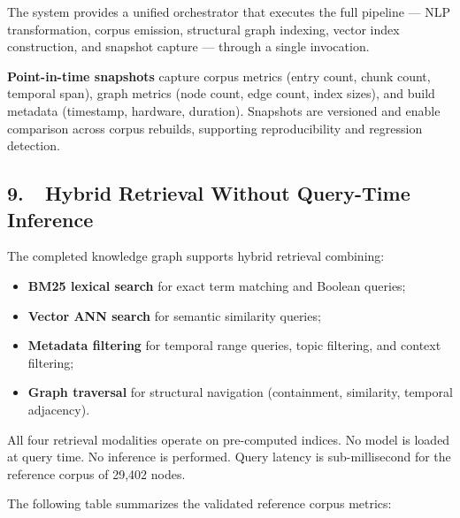 \documentclass[12pt,letterpaper]{article}
\begin{document}
The system provides a unified orchestrator that executes the full pipeline --- NLP
transformation, corpus emission, structural graph indexing, vector index construction,
and snapshot capture --- through a single invocation.

\textbf{Point-in-time snapshots} capture corpus metrics (entry count, chunk count,
temporal span), graph metrics (node count, edge count, index sizes), and build metadata
(timestamp, hardware, duration). Snapshots are versioned and enable comparison across
corpus rebuilds, supporting reproducibility and regression detection.

\subsection*{9.\ \ Hybrid Retrieval Without Query-Time Inference}

The completed knowledge graph supports hybrid retrieval combining:

\begin{itemize}[leftmargin=2cm, itemsep=3pt]
  \item \textbf{BM25 lexical search} for exact term matching and Boolean queries;
  \item \textbf{Vector ANN search} for semantic similarity queries;
  \item \textbf{Metadata filtering} for temporal range queries, topic filtering, and
        context filtering;
  \item \textbf{Graph traversal} for structural navigation (containment, similarity,
        temporal adjacency).
\end{itemize}

All four retrieval modalities operate on pre-computed indices. No model is loaded at
query time. No inference is performed. Query latency is sub-millisecond for the
reference corpus of 29,402 nodes.

\bigskip
\noindent The following table summarizes the validated reference corpus metrics:
\end{document}

